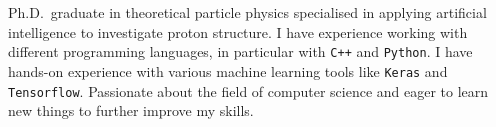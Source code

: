 

\begin{cvparagraph}

Ph.D.\ graduate in theoretical particle physics specialised in applying artificial intelligence to investigate
proton structure.
I have experience working with different programming languages, in particular with \texttt{C++} and \texttt{Python}.
I have hands-on experience with various machine learning tools like \texttt{Keras} and \texttt{Tensorflow}.
Passionate about the field of computer science and eager to learn new things to further improve my skills.
\end{cvparagraph}
